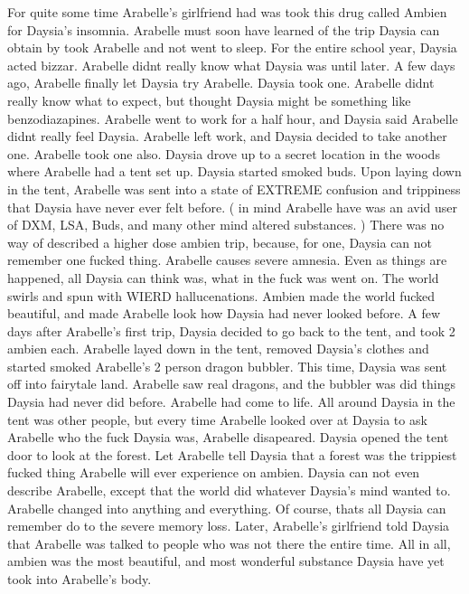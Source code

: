 \documentclass[12pt]{book}
\begin{document}
For quite some time Arabelle's girlfriend had was took this drug called Ambien for Daysia's insomnia. Arabelle must soon have learned of the trip Daysia can obtain by took Arabelle and not went to sleep. For the entire school year, Daysia acted bizzar. Arabelle didnt really know what Daysia was until later. A few days ago, Arabelle finally let Daysia try Arabelle. Daysia took one. Arabelle didnt really know what to expect, but thought Daysia might be something like benzodiazapines. Arabelle went to work for a half hour, and Daysia said Arabelle didnt really feel Daysia. Arabelle left work, and Daysia decided to take another one. Arabelle took one also. Daysia drove up to a secret location in the woods where Arabelle had a tent set up. Daysia started smoked buds. Upon laying down in the tent, Arabelle was sent into a state of EXTREME confusion and trippiness that Daysia have never ever felt before. (  in mind Arabelle have was an avid user of DXM, LSA, Buds, and many other mind altered substances. ) There was no way of described a higher dose ambien trip, because, for one, Daysia can not remember one fucked thing. Arabelle causes severe amnesia. Even as things are happened, all Daysia can think was, what in the fuck was went on. The world swirls and spun with WIERD hallucenations. Ambien made the world fucked beautiful, and made Arabelle look how Daysia had never looked before. A few days after Arabelle's first trip, Daysia decided to go back to the tent, and took 2 ambien each. Arabelle layed down in the tent, removed Daysia's clothes and started smoked Arabelle's 2 person dragon bubbler. This time, Daysia was sent off into fairytale land. Arabelle saw real dragons, and the bubbler was did things Daysia had never did before. Arabelle had come to life. All around Daysia in the tent was other people, but every time Arabelle looked over at Daysia to ask Arabelle who the fuck Daysia was, Arabelle disapeared. Daysia opened the tent door to look at the forest. Let Arabelle tell Daysia that a forest was the trippiest fucked thing Arabelle will ever experience on ambien. Daysia can not even describe Arabelle, except that the world did whatever Daysia's mind wanted to. Arabelle changed into anything and everything. Of course, thats all Daysia can remember do to the severe memory loss. Later, Arabelle's girlfriend told Daysia that Arabelle was talked to people who was not there the entire time. All in all, ambien was the most beautiful, and most wonderful substance Daysia have yet took into Arabelle's body.
\end{document}
